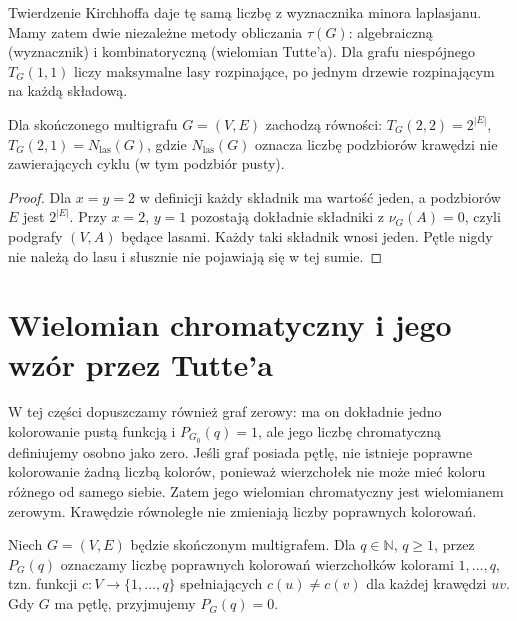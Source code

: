 \begin{uwaga}
Twierdzenie Kirchhoffa daje tę samą liczbę z wyznacznika
minora laplasjanu. Mamy zatem dwie niezależne metody
obliczania $\tau(G)$: algebraiczną (wyznacznik) i
kombinatoryczną (wielomian Tutte'a). Dla grafu niespójnego
$T_G(1,1)$ liczy maksymalne lasy rozpinające, po jednym
drzewie rozpinającym na każdą składową.
\end{uwaga}

\begin{stwierdzenie}
Dla skończonego multigrafu $G=(V,E)$ zachodzą równości:
$T_G(2,2)=2^{|E|}$,
$T_G(2,1)=N_{\mathrm{las}}(G)$,
gdzie $N_{\mathrm{las}}(G)$ oznacza liczbę podzbiorów
krawędzi nie zawierających cyklu (w tym podzbiór pusty).
\end{stwierdzenie}

\begin{proof}
Dla $x=y=2$ w definicji każdy składnik ma wartość jeden,
a podzbiorów $E$ jest $2^{|E|}$. Przy $x=2$, $y=1$
pozostają dokładnie składniki z $\nu_G(A)=0$, czyli
podgrafy $(V,A)$ będące lasami. Każdy taki składnik
wnosi jeden. Pętle nigdy nie należą do lasu i słusznie
nie pojawiają się w tej sumie.
\end{proof}

\section{Wielomian chromatyczny i jego wzór przez Tutte'a}
\label{sec:tg-chromatic}

\begin{uwaga}
W tej części dopuszczamy również graf zerowy: ma on dokładnie
jedno kolorowanie pustą funkcją i $P_{G_0}(q)=1$, ale jego
liczbę chromatyczną definiujemy osobno jako zero. Jeśli graf
posiada pętlę, nie istnieje poprawne kolorowanie żadną liczbą
kolorów, ponieważ wierzchołek nie może mieć koloru różnego
od samego siebie. Zatem jego wielomian chromatyczny jest
wielomianem zerowym. Krawędzie równoległe nie zmieniają
liczby poprawnych kolorowań.
\end{uwaga}

\begin{definicja}
Niech $G=(V,E)$ będzie skończonym multigrafem.
Dla $q\in\mathbb N$, $q\ge1$, przez $P_G(q)$ oznaczamy
liczbę poprawnych kolorowań wierzchołków kolorami
$1,\ldots,q$, tzn. funkcji $c:V\to\{1,\ldots,q\}$
spełniających $c(u)\ne c(v)$ dla każdej krawędzi $uv$.
Gdy $G$ ma pętlę, przyjmujemy $P_G(q)=0$.
\end{definicja}

